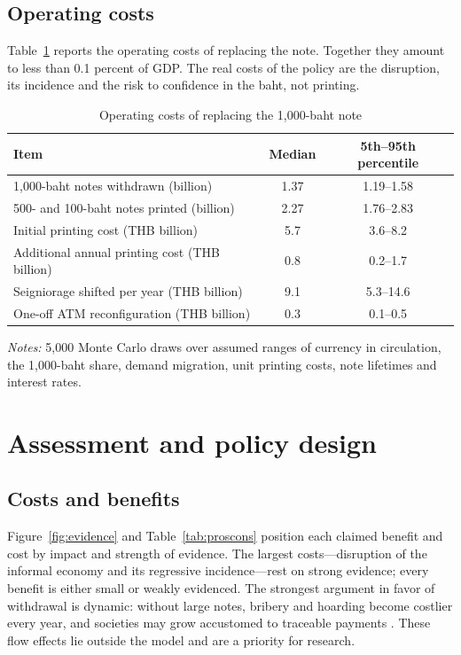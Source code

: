 \documentclass[11pt]{article}
\theoremstyle{definition}
\theoremstyle{remark}
\begin{document}
\subsection{Operating costs}
Table~\ref{tab:costs} reports the operating costs of replacing the note. Together they amount to less than 0.1 percent of
GDP. The real costs of the policy are the disruption, its incidence and the risk to confidence in the baht, not printing.

\begin{table}[!htbp]\centering\footnotesize
\caption{Operating costs of replacing the 1,000-baht note}\label{tab:costs}
\begin{tabular}{@{}lcc@{}}
\toprule
Item & Median & 5th--95th percentile\\
\midrule
1,000-baht notes withdrawn (billion) & 1.37 & 1.19--1.58\\
500- and 100-baht notes printed (billion) & 2.27 & 1.76--2.83\\
Initial printing cost (THB billion) & 5.7 & 3.6--8.2\\
Additional annual printing cost (THB billion) & 0.8 & 0.2--1.7\\
Seigniorage shifted per year (THB billion) & 9.1 & 5.3--14.6\\
One-off ATM reconfiguration (THB billion) & 0.3 & 0.1--0.5\\
\bottomrule
\end{tabular}
\par\smallskip\scriptsize\textit{Notes:} 5,000 Monte Carlo draws over assumed ranges of currency in circulation, the
1,000-baht share, demand migration, unit printing costs, note lifetimes and interest rates.
\end{table}

\section{Assessment and policy design}\label{sec:policy}

\subsection{Costs and benefits}
Figure~\ref{fig:evidence} and Table~\ref{tab:proscons} position each claimed benefit and cost by impact and strength of
evidence. The largest costs---disruption of the informal economy and its regressive incidence---rest on strong evidence;
every benefit is either small or weakly evidenced. The strongest argument in favor of withdrawal is dynamic: without large
notes, bribery and hoarding become costlier every year, and societies may grow accustomed to traceable payments
\citep{rogoff2016,sands2016}. These flow effects lie outside the model and are a priority for research.
\end{document}
